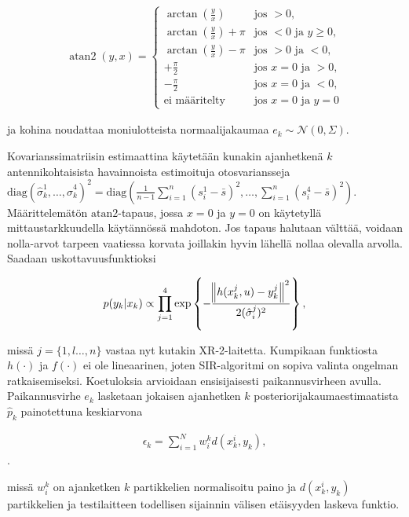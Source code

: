 \documentclass[
  12pt,
  a4paper, twoside]{book}
\begin{document}
\begin{align}\label{atan2}
\displaystyle \operatorname{atan2}(y,x)={\begin{cases}\arctan({\frac {y}{x}})&{\text{jos }}>0,\\\arctan({\frac {y}{x}})+\pi &{\text{jos }}<0{\text{ ja }}y\geq 0,\\\arctan({\frac {y}{x}})-\pi & {\text{jos }}>0{\text{ ja }}<0,\\+{\frac {\pi }{2}}&{\text{jos }}x=0{\text{ ja }}>0,\\-{\frac {\pi }{2}}&{\text{jos }}x=0{\text{ ja }}<0,\\{\text{ei määritelty}}&{\text{jos }}x=0{\text{ ja }}y=0\end{cases}}
\end{align}

\noindent ja kohina noudattaa moniulotteista normaalijakaumaa \(e_k\sim\mathcal{N}(0,{\Sigma})\).

Kovarianssimatriisin estimaattina käytetään kunakin ajanhetkenä \(k\) antennikohtaisista havainnoista estimoituja otosvariansseja \(\text{diag}(\hat{\sigma}^1_k,\ldots,\hat{\sigma}^4_k)^2=\text{diag}(\frac{1}{n-1}\sum_{i=1}^n(s_i^1-\bar{s})^2,\ldots,\sum_{i=1}^n(s_i^4-\bar{s})^2)\). Määrittelemätön \(\text{atan2}\)-tapaus, jossa \(x=0\) ja \(y=0\) on käytetyllä mittaustarkkuudella käytännössä mahdoton. Jos tapaus halutaan välttää, voidaan nolla-arvot tarpeen vaatiessa korvata joillakin hyvin lähellä nollaa olevalla arvolla. Saadaan uskottavuusfunktioksi

\begin{align}
p(y_k|x_k)\propto\prod_{j=1}^4\exp\left\{-\frac{\norm{h(x^j_k,u)-y^j_k}^2}{2(\hat{\sigma}_i^j)^2}\right\},
\end{align}

\noindent missä \(j=\{1,l\dots,n\}\) vastaa nyt kutakin XR-2-laitetta. Kumpikaan funktiosta \(h(\cdot)\) ja \(f(\cdot)\) ei ole lineaarinen, joten SIR-algoritmi on sopiva valinta ongelman ratkaisemiseksi. Koetuloksia arvioidaan ensisijaisesti paikannusvirheen avulla. Paikannusvirhe \(e_k\) lasketaan jokaisen ajanhetken \(k\) posteriorijakaumaestimaatista \(\hat{p}_k\) painotettuna keskiarvona

\begin{align}
\epsilon_k = \sum_{i=1}^Nw^k_i d(x^i_k, y_k),
\end{align}.

\noindent missä \(w_i^k\) on ajanketken \(k\) partikkelien normalisoitu paino ja \(d(x^i_k,y_k)\) partikkelien ja testilaitteen todellisen sijainnin välisen etäisyyden laskeva funktio.
\end{document}
